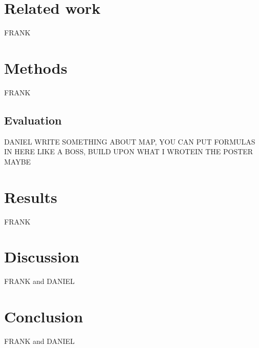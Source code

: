\documentclass[a4paper]{article}
\begin{document}
\section{Related work}
FRANK
\section{Methods}
FRANK
\subsection{Evaluation}
DANIEL WRITE SOMETHING ABOUT MAP, YOU CAN PUT FORMULAS IN HERE LIKE A BOSS, BUILD UPON WHAT I WROTEIN THE POSTER MAYBE
\section{Results}
FRANK 
\section{Discussion}
FRANK and DANIEL
\section{Conclusion}
FRANK and DANIEL
\end{document}
